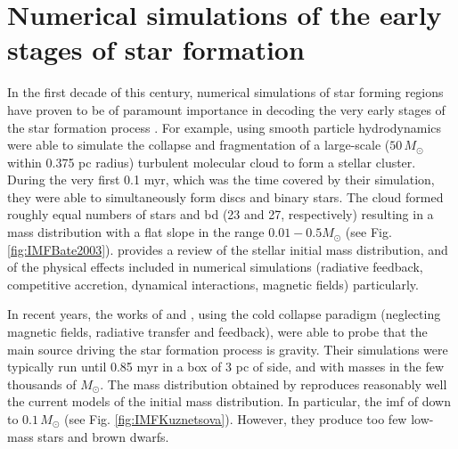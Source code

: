 \section{Numerical simulations of the early stages of star formation}
\label{sect:numerical_simulations}

In the first decade of this century, numerical simulations of star forming regions have proven to be of paramount importance in decoding the very early stages of the star formation process \cite[e.g][]{2003MNRAS.339..577B,2005A&A...435..611J,2009MNRAS.392..590B,2009MNRAS.392.1363B,2009MNRAS.397..232B}. For example, \citet{2003MNRAS.339..577B} using smooth particle hydrodynamics were able to simulate the collapse and fragmentation of a large-scale ($50\,M_{\odot}$ within 0.375 pc radius) turbulent molecular cloud to form a stellar cluster. During the very first 0.1 \gls{myr}, which was the time covered by their simulation, they were able to simultaneously form discs and binary stars. The cloud formed roughly equal numbers of stars and \gls{bd} (23 and 27, respectively) resulting in a mass distribution with a flat slope in the range $0.01-0.5 M_{\odot}$ (see Fig. \ref{fig:IMFBate2003}). \citet{Offner2014} provides a review of the stellar initial mass distribution, and of the physical effects included in numerical simulations (radiative feedback, competitive accretion, dynamical interactions, magnetic fields) particularly. 

In recent years, the works of \citet{2015ApJ...815...27K} and \citet{2015MNRAS.452..566B}, using the cold collapse paradigm (neglecting magnetic fields, radiative transfer and feedback), were able to probe that the main source driving the star formation process is gravity. Their simulations were typically run until 0.85 \gls{myr} in a box of 3 pc of side, and with masses in the few thousands of $M_{\odot}$. The mass distribution obtained by \citet{2015ApJ...815...27K} reproduces reasonably well the current models of the initial mass distribution. In particular, the \gls{imf} of \citet{Chabrier2005} down to  $0.1\,M_{\odot}$ (see Fig. \ref{fig:IMFKuznetsova}). However, they produce too few low-mass stars and brown dwarfs.


